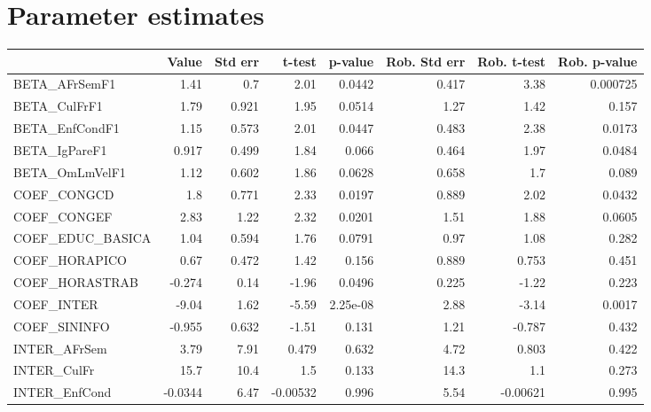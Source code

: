 \section{Parameter estimates}
\begin{tabular}{lrrrrrrr}
\toprule
{} &   Value &  Std err &   t-test &  p-value &  Rob. Std err &  Rob. t-test &  Rob. p-value \\
\midrule
BETA\_AFrSemF1      &    1.41 &      0.7 &     2.01 &   0.0442 &         0.417 &         3.38 &      0.000725 \\
BETA\_CulFrF1       &    1.79 &    0.921 &     1.95 &   0.0514 &          1.27 &         1.42 &         0.157 \\
BETA\_EnfCondF1     &    1.15 &    0.573 &     2.01 &   0.0447 &         0.483 &         2.38 &        0.0173 \\
BETA\_IgPareF1      &   0.917 &    0.499 &     1.84 &    0.066 &         0.464 &         1.97 &        0.0484 \\
BETA\_OmLmVelF1     &    1.12 &    0.602 &     1.86 &   0.0628 &         0.658 &          1.7 &         0.089 \\
COEF\_CONGCD        &     1.8 &    0.771 &     2.33 &   0.0197 &         0.889 &         2.02 &        0.0432 \\
COEF\_CONGEF        &    2.83 &     1.22 &     2.32 &   0.0201 &          1.51 &         1.88 &        0.0605 \\
COEF\_EDUC\_BASICA   &    1.04 &    0.594 &     1.76 &   0.0791 &          0.97 &         1.08 &         0.282 \\
COEF\_HORAPICO      &    0.67 &    0.472 &     1.42 &    0.156 &         0.889 &        0.753 &         0.451 \\
COEF\_HORASTRAB     &  -0.274 &     0.14 &    -1.96 &   0.0496 &         0.225 &        -1.22 &         0.223 \\
COEF\_INTER         &   -9.04 &     1.62 &    -5.59 & 2.25e-08 &          2.88 &        -3.14 &        0.0017 \\
COEF\_SININFO       &  -0.955 &    0.632 &    -1.51 &    0.131 &          1.21 &       -0.787 &         0.432 \\
INTER\_AFrSem       &    3.79 &     7.91 &    0.479 &    0.632 &          4.72 &        0.803 &         0.422 \\
INTER\_CulFr        &    15.7 &     10.4 &      1.5 &    0.133 &          14.3 &          1.1 &         0.273 \\
INTER\_EnfCond      & -0.0344 &     6.47 & -0.00532 &    0.996 &          5.54 &     -0.00621 &         0.995 \\

\end{tabular}
